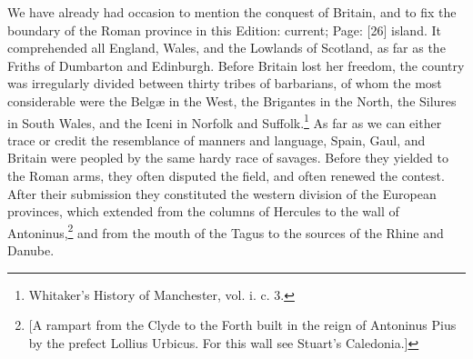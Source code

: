 We have already had occasion to mention the conquest of Britain, and to fix the boundary of the Roman province in this Edition: current; Page: [26] island. It comprehended all England, Wales, and the Lowlands of Scotland, as far as the Friths of Dumbarton and Edinburgh. Before Britain lost her freedom, the country was irregularly divided between thirty tribes of barbarians, of whom the most considerable were the Belgæ in the West, the Brigantes in the North, the Silures in South Wales, and the Iceni in Norfolk and Suffolk.\footnote{Whitaker\texthebrew{}’s History of Manchester, vol. i. c. 3.} As far as we can either trace or credit the resemblance of manners and language, Spain, Gaul, and Britain were peopled by the same hardy race of savages. Before they yielded to the Roman arms, they often disputed the field, and often renewed the contest. After their submission they constituted the western division of the European provinces, which extended from the columns of Hercules to the wall of Antoninus,\footnote{[A rampart from the Clyde to the Forth built in the reign of Antoninus Pius by the prefect Lollius Urbicus. For this wall see Stuart\texthebrew{}’s Caledonia.]} and from the mouth of the Tagus to the sources of the Rhine and Danube.

